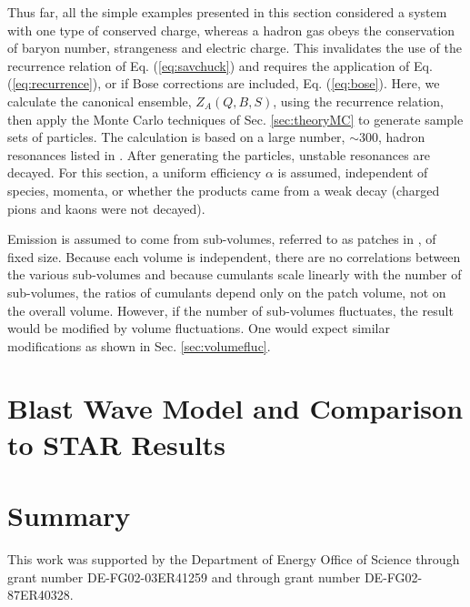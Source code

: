 \documentclass[aps,prc,nofootinbib,showpacs,superscriptaddress,groupedaddress]{revtex4-1}
\begin{document}
Thus far, all the simple examples presented in this section considered a system with one type of conserved charge, whereas a hadron gas obeys the conservation of baryon number, strangeness and electric charge. This invalidates the use of the recurrence relation of Eq. (\ref{eq:savchuck}) and requires the application of Eq. (\ref{eq:recurrence}), or if Bose corrections are included, Eq. (\ref{eq:bose}). Here, we calculate the canonical ensemble, $Z_A(Q,B,S)$, using the recurrence relation, then apply the Monte Carlo techniques of Sec. \ref{sec:theoryMC} to generate sample sets of particles. The calculation is based on a large number, $\sim 300$, hadron resonances listed in \cite{Tanabashi:2018oca}. After generating the particles, unstable resonances are decayed. For this section, a uniform efficiency $\alpha$ is assumed, independent of species, momenta, or whether the products came from a weak decay (charged pions and kaons were not decayed).

Emission is assumed to come from sub-volumes, referred to as patches in \cite{}, of fixed size. Because each volume is independent, there are no correlations between the various sub-volumes and because cumulants scale linearly with the number of sub-volumes, the ratios of cumulants depend only on the patch volume, not on the overall volume. However, if the number of sub-volumes fluctuates, the result would be modified by volume fluctuations. One would expect similar modifications as shown in Sec. \ref{sec:volumefluc}.

%


\section{Blast Wave Model and Comparison to STAR Results}\label{sec:blast}

\section{Summary}\label{sec:summary}

\begin{acknowledgments}
This work was supported by the Department of Energy Office of Science through grant number DE-FG02-03ER41259 and through grant number DE-FG02-87ER40328. 
\end{acknowledgments}
\end{document}
